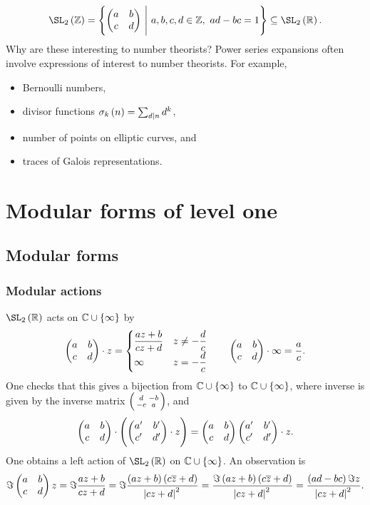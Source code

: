 $$ \SL_2\br{\ZZ} = \cbr{\twobytwo{a}{b}{c}{d} \st a, b, c, d \in \ZZ, \ ad - bc = 1} \subseteq \SL_2\br{\RR}. $$
Why are these interesting to number theorists? Power series expansions often involve expressions of interest to number theorists. For example,
\begin{itemize}
\item Bernoulli numbers,
\item divisor functions $ \sigma_k\br{n} = \sum_{d \mid n} d^k $,
\item number of points on elliptic curves, and
\item traces of Galois representations.
\end{itemize}

\pagebreak

\section{Modular forms of level one}

\subsection{Modular forms}

\subsubsection{Modular actions}

$ \SL_2\br{\RR} $ acts on $ \CC \cup \cbr{\infty} $ by
$$ \begin{pmatrix} a & b \\ c & d \end{pmatrix} \cdot z =
\begin{cases}
\dfrac{az + b}{cz + d} & z \ne -\dfrac{d}{c} \\
\infty & z = -\dfrac{d}{c}
\end{cases}
\qquad \begin{pmatrix} a & b \\ c & d \end{pmatrix} \cdot \infty = \dfrac{a}{c}.
$$
One checks that this gives a bijection from $ \CC \cup \cbr{\infty} $ to $ \CC \cup \cbr{\infty} $, where inverse is given by the inverse matrix $ \begin{psmallmatrix} d & -b \\ -c & a \end{psmallmatrix} $, and
$$ \twobytwo{a}{b}{c}{d} \cdot \br{\twobytwo{a'}{b'}{c'}{d'} \cdot z} = \twobytwo{a}{b}{c}{d}\twobytwo{a'}{b'}{c'}{d'} \cdot z. $$
One obtains a left action of $ \SL_2\br{\RR} $ on $ \CC \cup \cbr{\infty} $. An observation is
$$ \Im \twobytwo{a}{b}{c}{d}z = \Im \dfrac{az + b}{cz + d} = \Im \dfrac{\br{az + b}\br{c\overline{z} + d}}{\abs{cz + d}^2} = \dfrac{\Im \br{az + b}\br{c\overline{z} + d}}{\abs{cz + d}^2} = \dfrac{\br{ad - bc}\Im z}{\abs{cz + d}^2}. $$


